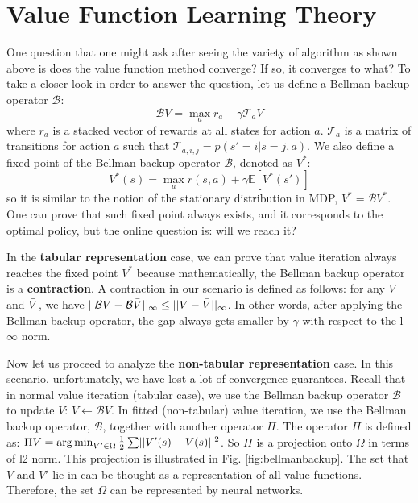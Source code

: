 \section{Value Function Learning Theory}
One question that one might ask after seeing the variety of algorithm as shown above is does the value function method converge? If so, it converges to what? To take a closer look in order to answer the question, let us define a Bellman backup operator $\mathcal{B}$:
$$\mathcal{B}V = \max_a r_a + \gamma\mathcal{T}_aV$$
where $r_a$ is a stacked vector of rewards at all states for action $a$. $\mathcal{T}_a$ is a matrix of transitions for action $a$ such that $\mathcal{T}_{a,i,j} = p(s'=i|s=j, a)$.
We also define a fixed point of the Bellman backup operator $\mathcal{B}$, denoted as $V^*$:
$$V^*(s) = \max_a r(s,a) + \gamma\mathbb{E}[V^*(s')]$$
so it is similar to the notion of the stationary distribution in MDP, $V^* = \mathcal{B}V^*$. One can prove that such fixed point always exists, and it corresponds to the optimal policy, but the online question is: will we reach it?

In the \textbf{tabular representation} case, we can prove that value iteration always reaches the fixed point $V^*$ because mathematically, the Bellman backup operator is a \textbf{contraction}. A contraction in our scenario is defined as follows: for any $V$ and $\Bar{V}$, we have $\lvert|\mathcal{B}V - \mathcal{B}\Bar{V}|\rvert_\infty \leq \lvert|V -\Bar{V}|\rvert_\infty$. In other words, after applying the Bellman backup operator, the gap always gets smaller by $\gamma$ with respect to the l-$\infty$ norm.

Now let us proceed to analyze the \textbf{non-tabular representation} case. In this scenario, unfortunately, we have lost a lot of convergence guarantees. Recall that in normal value iteration (tabular case), we use the Bellman backup operator $\mathcal{B}$ to update $V$: $V\leftarrow \mathcal{B}V$. In fitted (non-tabular) value iteration, we use the Bellman backup operator, $\mathcal{B}$, together with another operator $\Pi$. The operator $\Pi$ is defined as:
$\Pi V = \operatorname*{arg\,min}_{V'\in\Omega}\frac{1}{2}\sum\lvert|V'(s) - V(s)|\rvert^2$. So $\Pi$ is a projection onto $\Omega$ in terms of l2 norm. This projection is illustrated in Fig. \ref{fig:bellmanbackup}. The set that $V$ and $V'$ lie in can be thought as a representation of all value functions. Therefore, the set $\Omega$ can be represented by neural networks.

